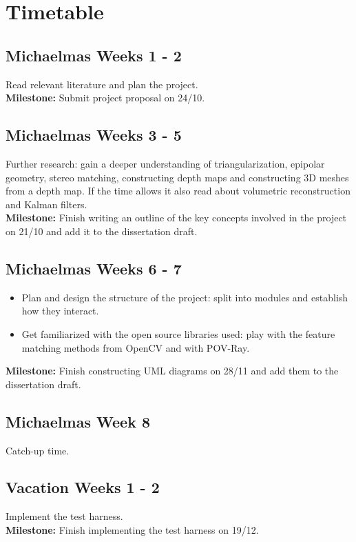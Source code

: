 \section*{Timetable}

\subsection*{Michaelmas Weeks 1 - 2}
Read relevant literature and plan the project.\\
{\bf Milestone:} Submit project proposal on 24/10.

\subsection*{Michaelmas Weeks 3 - 5}
Further research: gain a deeper understanding of triangularization, epipolar geometry, stereo matching, constructing depth maps and constructing 3D meshes from a depth map. If the time allows it also read about volumetric reconstruction and Kalman filters.  \\
{\bf Milestone:} Finish writing an outline of the key concepts involved in the project on 21/10 and add it to the dissertation draft.

\subsection*{Michaelmas Weeks 6 - 7}
\begin{itemize}
\item Plan and design the structure of the project: split into modules and establish how they interact.
\item Get familiarized with the open source libraries used: play with the feature matching methods from OpenCV and with POV-Ray.
\end{itemize}
{\bf Milestone:} Finish constructing UML diagrams on 28/11 and add them to the dissertation draft.

\subsection*{Michaelmas Week 8}
Catch-up time.
	
\subsection*{Vacation Weeks 1 - 2}
Implement the test harness.\\
{\bf Milestone:} Finish implementing the test harness on 19/12.

